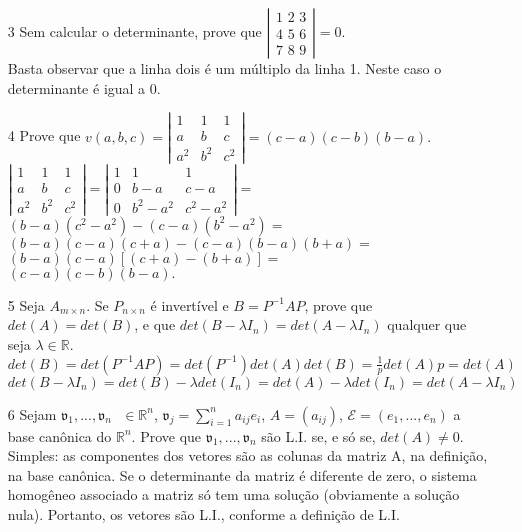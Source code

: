 \documentclass[a4paper]{article}
\begin{document}
\begin{itemize}
\item[3] Sem calcular o determinante, prove que 
$ \left \vert
\begin{array}{lll}
\displaystyle \text{1 2 3} \\
\displaystyle \text{4 5 6} \\
\displaystyle \text{7 8 9}
\end{array}
\right \vert = 0.
$
\\ \textcolor[rgb]{0,0,1}{Basta observar que a linha dois é um múltiplo da linha 1. Neste caso o determinante é igual a 0.}
\item[4] Prove que
$ v(a,b,c) = \left \vert
\begin{array}{lll}
\displaystyle 1&1&1 \\
\displaystyle a&b&c \\
\displaystyle a^2&b^2&c^2
\end{array}
\right \vert = (c-a)(c-b)(b-a).
$
\\ \textcolor[rgb]{0,0,1}{
$
\left \vert
\begin{array}{lll}
\displaystyle 1&1&1 \\
\displaystyle a&b&c \\
\displaystyle a^2&b^2&c^2
\end{array}
\right \vert = \left \vert
\begin{array}{lll}
\displaystyle 1&1&1 \\
\displaystyle 0&b-a&c-a \\
\displaystyle 0&b^2-a^2&c^2-a^2
\end{array}
\right \vert = $
\\
$(b-a)(c^2-a^2)-(c-a)(b^2-a^2) = $
\\
$(b-a)(c-a)(c+a)-(c-a)(b-a)(b+a) = $
\\
$(b-a)(c-a)[(c+a)-(b+a)] = $
\\
$(c-a)(c-b)(b-a).
$
}

\item[5] Seja $A_{m\times n}$. Se $P_{n\times n}$ é invertível e $B=P^{-1}AP$, prove que $det(A)=det(B)$, e que $det(B-\lambda I_n)=det(A-\lambda I_n)$ qualquer que seja $\lambda \in \mathbb{R}$.
\\ \textcolor[rgb]{0,0,1}{
$det(B)=det(P^{-1}AP)=det(P^{-1})det(A)det(B)=\frac{1}{p}det(A)p=det(A)$
\\
$det(B-\lambda I_n)=det(B)-\lambda det(I_n)=det(A)-\lambda det(I_n)=det(A-\lambda I_n)$
}

\item[6] Sejam $\mathfrak{v}_1,...,\mathfrak{v}_n\text{ }\in \mathbb{R}^n$, $\mathfrak{v}_j=\sum_{i=1}^n a_{ij}e_i$, $A=(a_{ij})$, $\mathcal{E}=(e_1,...,e_n)$ a base canônica do $\mathbb{R}^n$. Prove que $\mathfrak{v}_1,...,\mathfrak{v}_n$ são L.I. se, e só se, $det(A)\neq0$.\\
\textcolor[rgb]{0,0,1}{Simples: as componentes dos vetores são as colunas da matriz A, na definição, na base canônica. Se o determinante da matriz é diferente de zero, o sistema homogêneo associado a matriz só tem uma solução (obviamente a solução nula). Portanto, os vetores são L.I., conforme a definição de L.I.}


\end{itemize}
\end{document}
